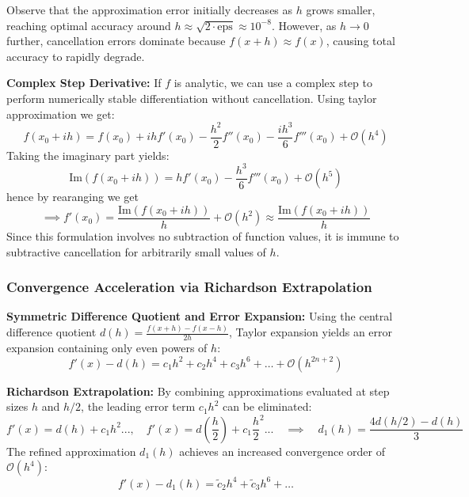 \begin{remark} 
    Observe that the approximation error initially decreases as $h$ grows smaller, reaching optimal accuracy around $h \approx \sqrt{2 \cdot \text{eps}} \approx 10^{-8}$. However, as $h \to 0$ further, cancellation errors dominate because $f(x+h) \approx f(x)$, causing total accuracy to rapidly degrade.
\end{remark}  

\begin{theorem}
    \textbf{Complex Step Derivative:} If $f$ is analytic, we can use a complex step to perform numerically stable differentiation without cancellation. Using taylor approximation we get:
    $$f(x_0 + ih) = f(x_0) + i h f'(x_0) - \frac{h^2}{2} f''(x_0) - \frac{i h^3}{6} f'''(x_0) + \mathcal{O}(h^4)$$
    Taking the imaginary part yields:
    $$\text{Im}\left(f(x_0 + ih)\right) = h f'(x_0) - \frac{h^3}{6} f'''(x_0) + \mathcal{O}(h^5)$$
    hence by rearanging we get
    $$\implies f'(x_0) = \frac{\text{Im}\left(f(x_0 + ih)\right)}{h} + \mathcal{O}(h^2) \approx \frac{\text{Im}\left(f(x_0 + ih)\right)}{h}$$
    Since this formulation involves no subtraction of function values, it is immune to subtractive cancellation for arbitrarily small values of $h$.
\end{theorem}  

\subsubsection{Convergence Acceleration via Richardson Extrapolation}

\begin{theorem}
    \textbf{Symmetric Difference Quotient and Error Expansion:} Using the central difference quotient $d(h) = \frac{f(x+h) - f(x-h)}{2h}$, Taylor expansion yields an error expansion containing only even powers of $h$:$$f'(x) - d(h) = c_1 h^2 + c_2 h^4 + c_3 h^6 + \dots + \mathcal{O}(h^{2n+2})$$
\end{theorem}

\begin{theorem}
    \textbf{Richardson Extrapolation:} By combining approximations evaluated at step sizes $h$ and $h/2$, the leading error term $c_1 h^2$ can be eliminated:
    $$f'(x) = d(h)+c_1h^2 ..., \quad f'(x) = d(\frac{h}{2}) + c_1 \frac{h}{2}^2 ... \quad \implies \quad d_1(h) = \frac{4 d(h/2) - d(h)}{3}$$
    The refined approximation $d_1(h)$ achieves an increased convergence order of $\mathcal{O}(h^4)$:$$f'(x) - d_1(h) = \tilde{c}_2 h^4 + \tilde{c}_3 h^6 + \dots$$
\end{theorem}

